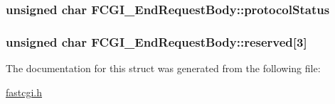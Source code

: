 \hypertarget{structFCGI__EndRequestBody_ae5d149d1d4755f0c0bc0867ba5de2cec}{
\subsubsection[{protocol\-Status}]{\setlength{\rightskip}{0pt plus 5cm}unsigned char F\-C\-G\-I\-\_\-\-End\-Request\-Body\-::protocol\-Status}}\label{structFCGI__EndRequestBody_ae5d149d1d4755f0c0bc0867ba5de2cec}
\hypertarget{structFCGI__EndRequestBody_a599ca22f232d473e9c783075bd1fb905}{
\subsubsection[{reserved}]{\setlength{\rightskip}{0pt plus 5cm}unsigned char F\-C\-G\-I\-\_\-\-End\-Request\-Body\-::reserved\mbox{[}3\mbox{]}}}\label{structFCGI__EndRequestBody_a599ca22f232d473e9c783075bd1fb905}


The documentation for this struct was generated from the following file\-:\begin{DoxyCompactItemize}
\item 
\hyperlink{fastcgi_8h}{fastcgi.\-h}\end{DoxyCompactItemize}
